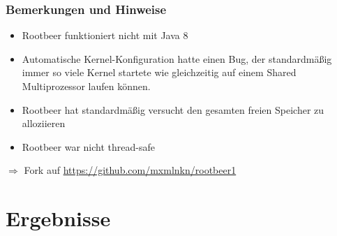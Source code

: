 \begin{frame}[fragile]
    \frametitle{Bemerkungen und Hinweise}
    \begin{itemize}
        \item Rootbeer funktioniert nicht mit Java 8
        \item Automatische Kernel-Konfiguration hatte einen Bug, der standardmäßig immer so viele Kernel startete wie gleichzeitig auf einem Shared Multiprozessor laufen können.
        \item Rootbeer hat standardmäßig versucht den gesamten freien Speicher zu alloziieren
        \item Rootbeer war nicht thread-safe
  \end{itemize}
  $\Rightarrow$ Fork auf \url{https://github.com/mxmlnkn/rootbeer1}
\end{frame}

\section{Ergebnisse}

